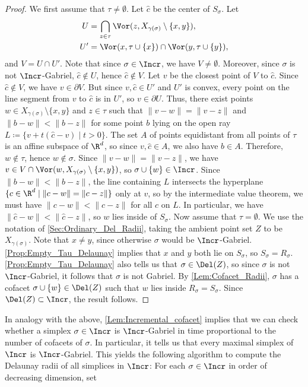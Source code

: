 \begin{proof}
We first assume that $\tau\ne \emptyset$.  Let $\hat c$ be the center of $S_{\sigma}$.  Let 
\begin{align*}
U&=\bigcap_{z\in \tau} \Vor(z,X_{\gamma(\sigma)}\setminus \{x,y\}),\\ 
U'&=\Vor(x,\tau\cup\{x\})\cap  \Vor(y,\tau\cup\{y\}),
\end{align*}
and $V=U\cap U'$.  Note that since $\sigma\in \Incr$, we have $V\ne \emptyset$.  Moreover, since $\sigma$ is not $\Incr$-Gabriel, $\hat c\notin U$, hence $\hat c\not\in V$.     Let $v$ be the closest point of $V$ to $\hat c$. Since $\hat c \notin V$, we have $v\in \partial V$.    But since $v,\hat c\in U'$ and $U'$ is convex, every point on the line segment from $v$ to $\hat c$ is in $U'$, so $v\in \partial U$.  Thus, there exist points $w \in X_{\gamma(\sigma)}\setminus\{x,y\}$ and $z\in \tau$ such that $\|v-w\|=\|v-z\|$ and $\|b-w\|<\|b-z\|$ for some point $b$ lying on the open ray $L\coloneqq \{v+t(\hat c-v)\mid t>0\}$.  The set $A$ of points equidistant from all points of $\tau$ is an affine subspace of $\R^d$, so since $v,\hat c\in A$, we also have $b\in A$.  Therefore, $w\not\in\tau$, hence $w\not\in \sigma$.  Since $\|v-w\|=\|v-z\|$, we have $v \in V\cap \Vor(w,X_{\gamma(\sigma)}\setminus \{x,y\})$, so $\sigma \cup \{w\} \in \Incr$.  Since $\|b-w\|<\|b-z\|$, the line containing $L$ intersects the hyperplane $\{c\in \R^d \mid \|c-w\|= \|c-z\|\}$ only at $v$, so by the intermediate value theorem, we must have  $\|c-w\|<\|c-z\|$ for all $c$ on $L$.  In particular, we have  $\|\hat c-w\|<\|\hat c-z\|$, so $w$ lies inside of $S_{\sigma}$.
%
Now assume that $\tau= \emptyset$.  We use the notation of \cref{Sec:Ordinary_Del_Radii}, taking the ambient point set $Z$ to be $X_{\gamma(\sigma)}$.  Note that $x\ne y$, since otherwise $\sigma$ would be $\Incr$-Gabriel.   \cref{Prop:Empty_Tau_Delaunay} implies that $x$ and $y$ both lie on $S_\sigma$, so $S_{\sigma}=R_{\sigma}$.   \cref{Prop:Empty_Tau_Delaunay} also tells us that $\sigma\in \Del(Z)$, so since $\sigma$ is not $\Incr$-Gabriel, it follows that $\sigma$ is not Gabriel.  By \cref{Lem:Cofacet_Radii}, $\sigma$ has a cofacet $\sigma \cup \{w\} \in \Del(Z)$ such that $w$ lies inside $R_{\sigma}=S_{\sigma}$.  Since $\Del(Z)\subset \Incr$, the result follows. 
\end{proof}
%
In analogy with the above, \cref{Lem:Incremental_cofacet} implies that we can check whether a simplex $\sigma\in \Incr$ is $\Incr$-Gabriel in time proportional to the number of cofacets of $\sigma$.   In particular, it tells us that every maximal simplex of $\Incr$ is $\Incr$-Gabriel.  This yields the following algorithm to compute the Delaunay radii of all simplices in $\Incr$: For each $\sigma \in \Incr$ in order of decreasing dimension, set 
